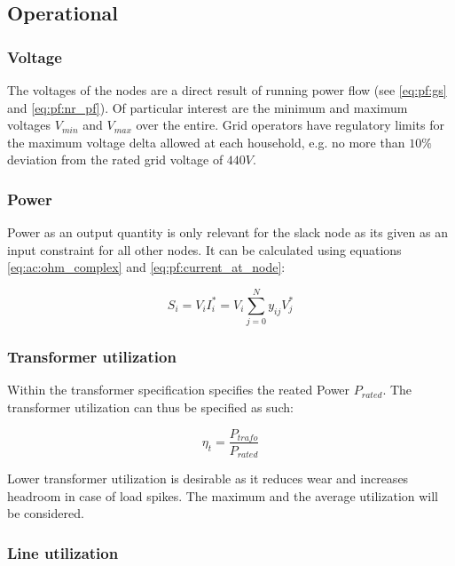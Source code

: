 \subsection{Operational}\label{sec:operational_measures}

\subsubsection{Voltage}

The voltages of the nodes are a direct result of running power flow 
(see \autoref{eq:pf:gs} and \autoref{eq:pf:nr_pf}). Of particular
interest are the minimum and maximum voltages $V_{min}$ and $V_{max}$
over the entire. Grid operators have regulatory limits for the maximum
voltage delta allowed at each household, e.g. no more than $10\%$
deviation from the rated grid voltage of $440V$\autocite{venios}.

\subsubsection{Power}

Power as an output quantity is only relevant for the slack node as its
given as an input constraint for all other nodes. It can be calculated
using equations \ref{eq:ac:ohm_complex} and \ref{eq:pf:current_at_node}:

\begin{equation}
  S_i = V_i I_i^* = V_i \sum_{j = 0}^N y_{ij} V_j^*
  \label{eq:measures:power}
\end{equation}

\subsubsection{Transformer utilization}

Within the transformer specification specifies the reated Power $P_{rated}$.
The transformer utilization can thus be specified as such:

\begin{equation}
  \eta_t = \frac{P_{trafo}}{P_{rated}}
  \label{eq:measures:trafo_utilization}
\end{equation}

Lower transformer utilization is desirable as it reduces wear and increases
headroom in case of load spikes. The maximum and the average utilization
will be considered.

\subsubsection{Line utilization}

